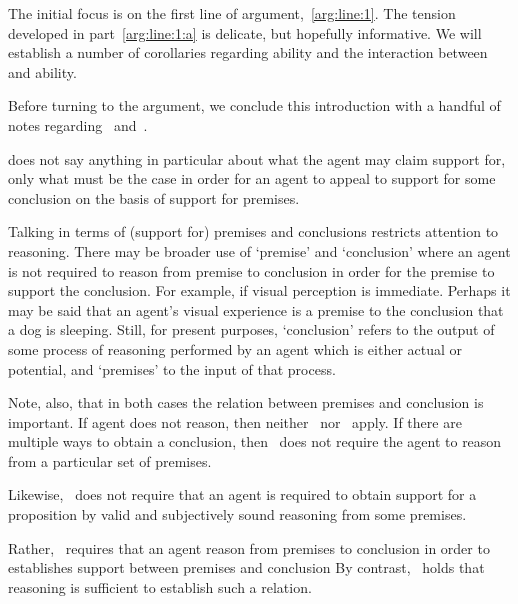 \begin{note}
  The initial focus is on the first line of argument,~\ref{arg:line:1}.
  The tension developed in part~\ref{arg:line:1:a} is delicate, but hopefully informative.
  We will establish a number of corollaries regarding ability and the interaction between~\uRa{} and ability.
\end{note}

\begin{note}
  Before turning to the argument, we conclude this introduction with a handful of notes regarding~\uRa{} and~\rC{}.
\end{note}

\begin{note}
  \uRa{} does not say anything in particular about what the agent may claim support for, only what must be the case in order for an agent to appeal to support for some conclusion on the basis of support for premises.

  Talking in terms of (support for) premises and conclusions restricts attention to reasoning.
  There may be broader use of `premise' and `conclusion' where an agent is not required to reason from premise to conclusion in order for the premise to support the conclusion.
  For example, if visual perception is immediate.
  Perhaps it may be said that an agent's visual experience is a premise to the conclusion that a dog is sleeping.
  Still, for present purposes, `conclusion' refers to the output of some process of reasoning performed by an agent which is either actual or potential, and `premises' to the input of that process.

  Note, also, that in both cases the relation between premises and conclusion is important.
  If agent does not reason, then neither~\bP{} nor~\uRa{} apply.
  If there are multiple ways to obtain a conclusion, then~\uRa{} does not require the agent to reason from a particular set of premises.

  Likewise,~\uRa{} does not require that an agent is required to obtain support for a proposition by valid and subjectively sound reasoning from some premises.

  Rather,~\uRa{} requires that an agent reason from premises to conclusion in order to establishes support between premises and conclusion
  By contrast,~\bP{} holds that reasoning is sufficient to establish such a relation.
\end{note}

